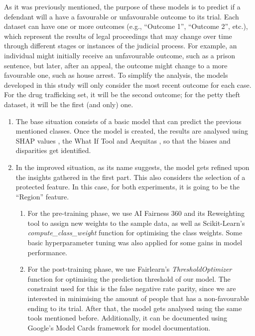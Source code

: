 \documentclass[fleqn,10pt]{wlscirep}
\begin{document}
As it was previously mentioned, the purpose of these models is to predict if a defendant will a have a favourable or unfavourable outcome to its trial. Each dataset can have one or more outcomes (e.g., ``Outcome 1'', ``Outcome 2'', etc.), which represent the results of legal proceedings that may change over time through different stages or instances of the judicial process. For example, an individual might initially receive an unfavourable outcome, such as a prison sentence, but later, after an appeal, the outcome might change to a more favourable one, such as house arrest. To simplify the analysis, the models developed in this study will only consider the most recent outcome for each case. For the drug trafficking set, it will be the second outcome; for the petty theft dataset, it will be the first (and only) one.

\begin{enumerate}
    \item The base situation consists of a basic model that can predict the previous mentioned classes. Once the model is created, the results are analysed using SHAP values \cite{NIPS2017_7062}, the What If Tool \cite{wexler_2018} and Aequitas \cite{DBLP:journals/corr/abs-1811-05577}, so that the biases and disparities get identified.

    \item In the improved situation, as its name suggests, the model gets refined upon the insights gathered in the first part. This also considers the selection of a protected feature. In this case, for both experiments, it is going to be the ``Region'' feature.

    \begin{enumerate}
        \item For the pre-training phase, we use AI Fairness 360 \cite{aif360-oct-2018} and its Reweighting tool to assign new weights to the sample data, as well as Scikit-Learn's \cite{scikit-learn} \textit{compute\_class\_weight} function for optimising the class weights. Some basic hyperparameter tuning was also applied for some gains in model performance.

        \item For the post-training phase, we use Fairlearn's \textit{ThresholdOptimizer} function for optimising the prediction threshold of our model. The constraint used for this is the false negative rate parity, since we are interested in minimising the amount of people that has a non-favourable ending to its trial. After that, the model gets analysed using the same tools mentioned before. Additionally, it can be documented using Google's Model Cards framework for model documentation.
    \end{enumerate}
\end{enumerate}
\end{document}
